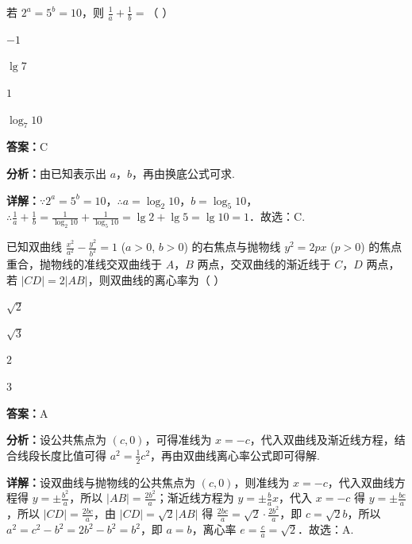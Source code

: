 \begin{question}[points=5]
若 $2^a = 5^b = 10$，则 $\frac{1}{a} + \frac{1}{b} =$（   ）
\begin{choices}
  \item $-1$
  \item $\lg 7$
  \item $1$
  \item $\log_{7} 10$
\end{choices}
\begin{solution}
\textbf{答案：}C

\textbf{分析：}由已知表示出 $a$，$b$，再由换底公式可求.

\textbf{详解：}$\because 2^a = 5^b = 10$，$\therefore a = \log_2 10$，$b = \log_5 10$，$\therefore \frac{1}{a} + \frac{1}{b} = \frac{1}{\log_2 10} + \frac{1}{\log_5 10} = \lg 2 + \lg 5 = \lg 10 = 1$．故选：C.
\end{solution}
\end{question}

\begin{question}[points=5]
已知双曲线 $\frac{x^2}{a^2} - \frac{y^2}{b^2} = 1$ ($a > 0$, $b > 0$) 的右焦点与抛物线 $y^2 = 2px$ ($p > 0$) 的焦点重合，抛物线的准线交双曲线于 $A$，$B$ 两点，交双曲线的渐近线于 $C$，$D$ 两点，若 $|CD| = 2|AB|$，则双曲线的离心率为（   ）
\begin{choices}
  \item $\sqrt{2}$
  \item $\sqrt{3}$
  \item $2$
  \item $3$
\end{choices}
\begin{solution}
\textbf{答案：}A

\textbf{分析：}设公共焦点为 $(c,0)$，可得准线为 $x=-c$，代入双曲线及渐近线方程，结合线段长度比值可得 $a^2 = \frac{1}{2}c^2$，再由双曲线离心率公式即可得解.

\textbf{详解：}设双曲线与抛物线的公共焦点为 $(c,0)$，则准线为 $x=-c$，代入双曲线方程得 $y = \pm \frac{b^2}{a}$，所以 $|AB| = \frac{2b^2}{a}$；渐近线方程为 $y = \pm \frac{b}{a}x$，代入 $x=-c$ 得 $y = \pm \frac{bc}{a}$，所以 $|CD| = \frac{2bc}{a}$，由 $|CD| = \sqrt{2}|AB|$ 得 $\frac{2bc}{a} = \sqrt{2} \cdot \frac{2b^2}{a}$，即 $c = \sqrt{2}b$，所以 $a^2 = c^2 - b^2 = 2b^2 - b^2 = b^2$，即 $a=b$，离心率 $e = \frac{c}{a} = \sqrt{2}$．故选：A.
\end{solution}
\end{question}

